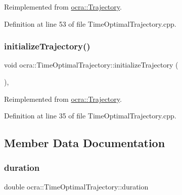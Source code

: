 Reimplemented from \hyperlink{classocra_1_1Trajectory_ad65e4ce63f33d79d7880742035a64d6c}{ocra\+::\+Trajectory}.



Definition at line 53 of file Time\+Optimal\+Trajectory.\+cpp.

\hypertarget{classocra_1_1TimeOptimalTrajectory_a1ddd759810abea6db2462dca3aae585c}{}\label{classocra_1_1TimeOptimalTrajectory_a1ddd759810abea6db2462dca3aae585c} 
\subsubsection{\texorpdfstring{initialize\+Trajectory()}{initializeTrajectory()}}
{\footnotesize\ttfamily void ocra\+::\+Time\+Optimal\+Trajectory\+::initialize\+Trajectory (\begin{DoxyParamCaption}{ }\end{DoxyParamCaption})\hspace{0.3cm}{\ttfamily [protected]}, {\ttfamily [virtual]}}



Reimplemented from \hyperlink{classocra_1_1Trajectory_aa49b123abf79be71f131c138ff2a88b2}{ocra\+::\+Trajectory}.



Definition at line 35 of file Time\+Optimal\+Trajectory.\+cpp.



\subsection{Member Data Documentation}
\hypertarget{classocra_1_1TimeOptimalTrajectory_a6c6b5ffec595af24fd0061d47f85ebdf}{}\label{classocra_1_1TimeOptimalTrajectory_a6c6b5ffec595af24fd0061d47f85ebdf} 
\subsubsection{\texorpdfstring{duration}{duration}}
{\footnotesize\ttfamily double ocra\+::\+Time\+Optimal\+Trajectory\+::duration\hspace{0.3cm}{\ttfamily [protected]}}




